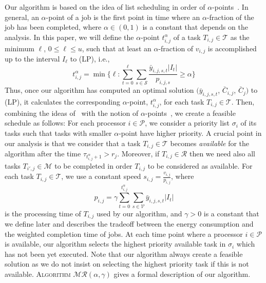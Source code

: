 \documentclass{llncs}
\newcommand{\algomr}{\textsc{Algorithm} $\mathcal{MR}(\alpha,\gamma)$\xspace}
\begin{document}
Our algorithm is based on the idea of list scheduling in order of $\alpha$-points~\cite{HallSSW97}.
In general, an $\alpha$-point of a job is the first point in time
where an $\alpha$-fraction of the job has been completed, where $\alpha \in (0,1)$ is a constant that depends on the analysis.
In this paper, we will define the $\alpha$-point $t_{i,j}^{\alpha}$ of a task $T_{i,j} \in \mathcal{T}$ as
the minimum $\ell$, $0 \leq \ell \leq u$, such that at least an $\alpha$-fraction of $v_{i,j}$ is accomplished up to the interval $I_{\ell}$ to (LP), i.e.,
\begin{equation*}
t_{i,j}^{\alpha} = \min\Bigg\{\ell: \sum_{t=0}^{\ell} \sum_{s \in \mathcal{S}} \frac{\bar{y}_{i,j,s,t} |I_t|}{p_{i,j,s}} \geq \alpha \Bigg\}\label{eq:a-point}
\end{equation*}
Thus, once our algorithm has computed an optimal solution $(\bar{y}_{i,j,s,t}$, $\bar{C}_{i,j}$, $\bar{C}_j)$ to (LP),
it calculates the corresponding $\alpha$-point, $t_{i,j}^{\alpha}$, for each task $T_{i,j}\in \mathcal{T}$.
Then, combining the ideas of~\cite{ChenKL12} with the notion of $\alpha$-points~\cite{HallSSW97}, we create a feasible schedule as follows:
For each processor $i \in \mathcal{P}$, we consider a priority list $\sigma_i$ of its tasks such that tasks with smaller $\alpha$-point have higher priority.
A crucial point in our analysis is that we consider that a task $T_{i,j} \in \mathcal{T}$
becomes \emph{available} for the algorithm after the time $\tau_{t_{i,j}^{\alpha}+1} > r_j$.
Moreover, if $T_{i,j} \in \mathcal{R}$ then we need also all tasks $T_{i',j} \in \mathcal{M}$ to be completed in order $T_{i,j}$ to be considered as available.
For each task $T_{i,j} \in \mathcal{T}$, we use a constant speed $s_{i,j}=\frac{v_{i,j}}{p_{i,j}}$, where
\begin{equation*}
p_{i,j} = \gamma \sum_{t=0}^{t_{i,j}^{\alpha}} \sum_{s\in\mathcal{V}} \bar{y}_{i,j,s,t}|I_t|
\end{equation*}
is the processing time of $T_{i,j}$ used by our algorithm,
and $\gamma>0$ is a constant that we define later and describes the tradeoff between the energy consumption and the weighted completion time of jobs.
At each time point where a processor $i \in \mathcal{P}$ is available,
our algorithm selects the highest priority available task in $\sigma_i$ which has not been yet executed.
Note that our algorithm always create a feasible solution as we do not insist on selecting the highest priority task if this is not available.
\algomr gives a formal description of our algorithm.
\end{document}
